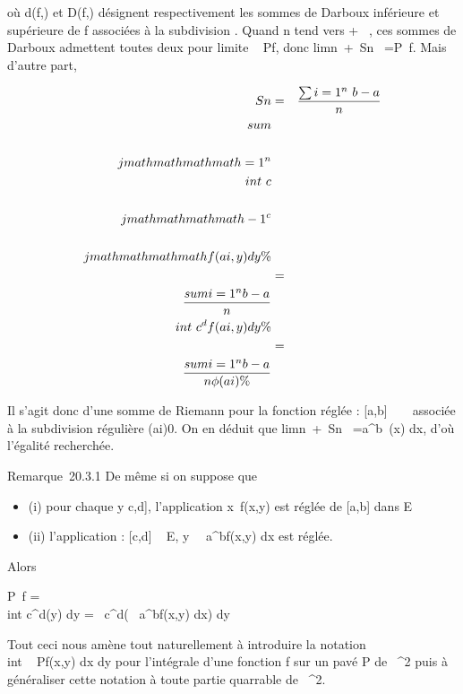 où d(f,\sigman) et D(f,\sigman) désignent respectivement les
sommes de Darboux inférieure et supérieure de f associées à la
subdivision \sigman. Quand n tend vers + \infty~, ces sommes de Darboux
admettent toutes deux pour limite \int ~
Pf, donc limn\rightarrow~+\infty~Sn~
=\int  P~f. Mais d'autre part,

\begin{align*} Sn& =&
\sum i=1^n~ b - a
\over n \\sum
\\\\jmathmathmathmath=1^n
\\int  ~
c\\\\jmathmathmathmath-1^c\\\\jmathmathmathmath f(ai,y) dy\%&
\\ & =& \\sum
i=1^n b - a \over n
\\int  ~
c^df(a i,y) dy \%&
\\ & =& \\sum
i=1^n b - a \over n \phi(ai)
\%& \\ \end{align*}

Il s'agit donc d'une somme de Riemann pour la fonction réglée \phi :
{[}a,b{]} \rightarrow~ ~ associée à la subdivision régulière
(ai)0\leqi\leqn. On en déduit que
limn\rightarrow~+\infty~Sn~
=\int  a^b~\phi(x) dx, d'où
l'égalité recherchée.

Remarque~20.3.1 De même si on suppose que

\begin{itemize}
\itemsep1pt\parskip0pt
\item
  (i) pour chaque y \in {[}c,d{]}, l'application
  x\mapsto~f(x,y) est réglée de {[}a,b{]} dans E
\item
  (ii) l'application \psi : {[}c,d{]} \rightarrow~ E,
  y\mapsto~\int ~
  a^bf(x,y) dx est réglée.
\end{itemize}

Alors

\int  P~f =\\int
 c^d\psi(y) dy =\int ~
c^d\left (\int ~
a^bf(x,y) dx\right ) dy

Tout ceci nous amène tout naturellement à introduire la notation
\int  \\int ~
Pf(x,y) dx dy pour l'intégrale d'une fonction f sur un pavé P de
~^2 puis à généraliser cette notation à toute partie
quarrable de ~^2.

